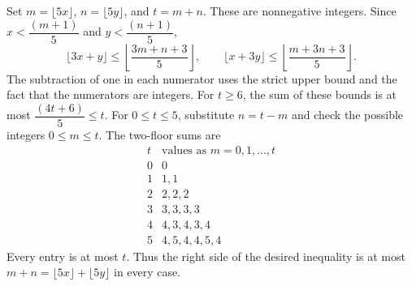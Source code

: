 Set $m=\lfloor5x\rfloor$, $n=\lfloor5y\rfloor$, and $t=m+n$. These are nonnegative integers. Since $x<\dfrac{(m+1)}{5}$ and $y<\dfrac{(n+1)}{5}$,
\[
\lfloor3x+y\rfloor\le\left\lfloor\dfrac{3m+n+3}{5}\right\rfloor,\qquad
\lfloor x+3y\rfloor\le\left\lfloor\dfrac{m+3n+3}{5}\right\rfloor.
\]
The subtraction of one in each numerator uses the strict upper bound and the fact that the numerators are integers.
For $t\ge6$, the sum of these bounds is at most $\dfrac{(4t+6)}{5}\le t$. For $0\le t\le5$, substitute $n=t-m$ and check the possible integers $0\le m\le t$. The two-floor sums are
\[
\begin{array}{c|l}
t&\text{values as }m=0,1,\ldots,t\\ \hline
0&0\\1&1,1\\2&2,2,2\\3&3,3,3,3\\
4&4,3,4,3,4\\5&4,5,4,4,5,4
\end{array}
\]
Every entry is at most $t$. Thus the right side of the desired inequality is at most $m+n=\lfloor5x\rfloor+\lfloor5y\rfloor$ in every case.
